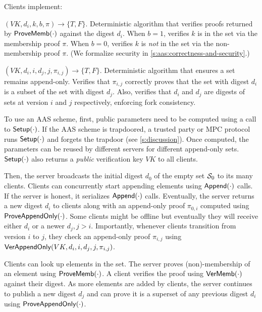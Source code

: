 Clients implement:
\vspace{.5em}

\api {\vermemb}$(VK, d_i, k, b, \pi) \rightarrow \{T, F\}$.
Deterministic algorithm that verifies proofs returned by $\mathsf{ProveMemb}(\cdot)$ against the digest $d_i$.
When $b=1$, verifies $k$ is in the set via the membership proof $\pi$.
When $b=0$, verifies $k$ is \textit{not} in the set via the non-membership proof $\pi$.
(We formalize security in \cref{s:aas:correctness-and-security}.)

\api {\verappendonly}$(VK, d_i, i, d_j, j, \pi_{i,j}) \rightarrow \{T, F\}$.
Deterministic algorithm that ensures a set remains append-only.
Verifies that $\pi_{i,j}$ correctly proves that the set with digest $d_i$ is a subset of the set with digest $d_j$.
Also, verifies that $d_i$ and $d_j$ are digests of sets at version $i$ and $j$ respectively, enforcing fork consistency.

To use an AAS scheme, first, public parameters need to be computed using a call to $\mathsf{Setup}(\cdot)$.
If the AAS scheme is trapdoored, a trusted party or MPC protocol runs $\mathsf{Setup}(\cdot)$ and forgets the trapdoor (see \cref{s:discussion}).
Once computed, the parameters can be reused by different servers for different append-only sets.
$\mathsf{Setup}(\cdot)$ also returns a \textit{public} verification key $VK$ to all clients.

Then, the server broadcasts the initial digest $d_0$ of the empty set $\mathcal{S}_0$ to its many clients.
Clients can concurrently start appending elements using $\mathsf{Append}(\cdot)$ calls.
If the server is honest, it serializes $\mathsf{Append}(\cdot)$ calls.
Eventually, the server returns a new digest $d_i$ to clients along with an append-only proof $\pi_{0,i}$ computed using $\mathsf{ProveAppendOnly}(\cdot)$.
Some clients might be offline but eventually they will receive either $d_i$ or a newer $d_j, j > i$.
Importantly, whenever clients transition from version $i$ to $j$, they check an append-only proof $\pi_{i,j}$ using $\mathsf{VerAppendOnly}(VK, d_i, i, d_j, j, \pi_{i,j})$.

Clients can look up elements in the set.
The server proves (non)\hyp{}membership of an element using $\mathsf{ProveMemb}(\cdot)$.
A client verifies the proof using $\mathsf{VerMemb}(\cdot)$ against their digest.
As more elements are added by clients, the server continues to publish a new digest $d_j$ and can prove it is a superset of any previous digest $d_i$ using $\mathsf{ProveAppendOnly}(\cdot)$.

